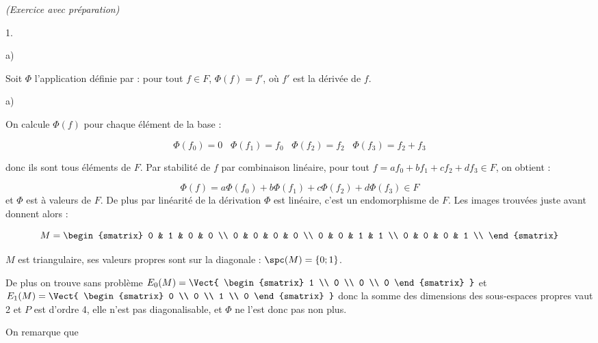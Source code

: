 \documentclass[11pt]{article}%
\begin{document}
\begin{exercice}{\it (Exercice avec préparation)}
\begin{noliste}{1.}
\begin{noliste}{a)}
 \end{noliste}

 \item Soit $\Phi$ l'application définie par : pour tout $f \in F$,
 $\Phi (f) = f'$, où $f'$ est la dérivée de $f$. 
 \begin{noliste}{a)}
 \setlength{\itemsep}{2mm}
 \item On calcule $\Phi (f)$ pour chaque élément de la base :
 
\[
 \Phi ( f_{0} ) = 0 \ \, \ \ \Phi ( f_{1} ) = f_{0} \ \, \ \ \Phi (
 f_{2} ) = f_{2} \ \, \ \ \Phi ( f_{3} ) = f_{2} + f_{3}
\]
 
 donc ils sont tous éléments de $F$. Par stabilité de $f$ par
 combinaison linéaire, pour tout $f = a f_{0} + b f_{1} + c f_{2} + d
 f_{3} \in F$, on obtient :
 
\[
 \Phi (f) = a \Phi ( f_{0} ) + b \Phi ( f_{1} ) + c \Phi ( f_{2} ) + d
 \Phi (f_{3} ) \in F
\]
 et $\Phi$ est à valeurs de $F$. De plus par linéarité de la
 dérivation $\Phi$ est linéaire, c'est un endomorphisme de
 $F$. Les images trouvées juste avant donnent alors :
 
\[
 M = 
 \begin{smatrix}
 0 & 1 & 0 & 0 \\
 0 & 0 & 0 & 0 \\
 0 & 0 & 1 & 1 \\
 0 & 0 & 0 & 1 \\
\end{smatrix}
\]
 
 \item $M$ est triangulaire, ses valeurs propres sont sur la
 diagonale : $\spc ( M ) = \{ 0 ; 1 \}$.
 
 De plus on trouve sans problème $E_{0} (M ) = \Vect{
 \begin{smatrix}
 1 \\
 0 \\
 0 \\
 0 
\end{smatrix}
}$ et $E_{1} (M) = \Vect { 
 \begin{smatrix}
 0 \\
 0 \\
 1 \\
 0 
\end{smatrix}
}$ donc la somme des dimensions des sous-espaces
 propres vaut 2 et $P$ est d'ordre 4, elle n'est pas
 diagonalisable, et $\Phi$ ne l'est donc pas non plus.

 \item On remarque que
 

\end{noliste}
\end{noliste}
\end{exercice}
\end{document}
